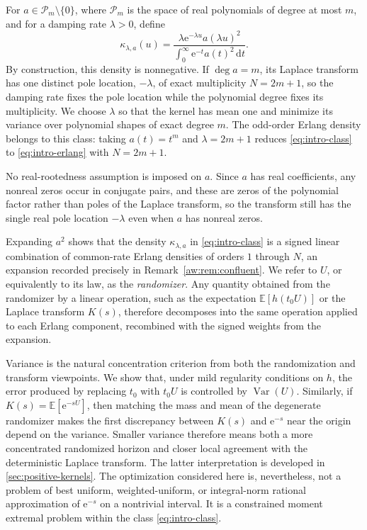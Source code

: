 \documentclass[11pt]{article}
\numberwithin{equation}{section}
\theoremstyle{definition}
\theoremstyle{remark}
\newcommand{\E}{\mathbb E}
\newcommand{\Var}{\operatorname{Var}}
\newcommand{\Pcal}{\mathcal P}
\newcommand{\dd}{\,\mathrm d}
\newcommand{\e}{\mathrm e}
\begin{document}
For $a\in\Pcal_m\setminus\{0\}$, where $\Pcal_m$ is the space of real
polynomials of degree at most $m$, and for a damping rate $\lambda>0$, define
\begin{equation}\label{eq:intro-class}
\kappa_{\lambda,a}(u)
\mathrel{{=}}
\frac{\lambda\e^{-\lambda u}a(\lambda u)^2}
{\displaystyle\int_0^\infty \e^{-t}a(t)^2\dd t}.
\end{equation}
By construction, this density is nonnegative. If $\deg a=m$, its Laplace
transform has one distinct pole location, $-\lambda$, of exact multiplicity $N=2m+1$,
so the damping rate fixes the pole location while the polynomial
degree fixes its multiplicity. We choose $\lambda$ so that the kernel
has mean one and minimize its variance over polynomial shapes of exact degree
$m$. The odd-order Erlang density belongs to this class: taking
$a(t)=t^m$ and $\lambda=2m+1$ reduces \eqref{eq:intro-class} to
\eqref{eq:intro-erlang} with $N=2m+1$.

No real-rootedness assumption is imposed on $a$. Since $a$ has real
coefficients, any nonreal zeros occur in conjugate pairs, and these are
zeros of the polynomial factor rather than poles of the Laplace transform,
so the transform still has the single real pole location $-\lambda$ even
when $a$ has nonreal zeros.

Expanding $a^2$ shows that the density $\kappa_{\lambda,a}$ in
\eqref{eq:intro-class} is a signed linear combination of common-rate Erlang
densities of orders $1$ through $N$, an expansion recorded precisely in
Remark~\ref{aw:rem:confluent}. We refer to $U$, or equivalently to its law, as the \emph{randomizer}. Any quantity obtained from the randomizer by a linear
operation, such as the expectation $\E[h(t_0U)]$ or the Laplace transform
$K(s)$, therefore decomposes into the same operation applied to each Erlang
component, recombined with the signed weights from the expansion.

Variance is the natural concentration criterion from both the randomization
and transform viewpoints. We show that, under mild regularity conditions on $h$, the
error produced by replacing $t_0$ with $t_0U$ is controlled by
$\Var(U)$. 
Similarly, if
$K(s)=\E[\e^{-sU}]$, then matching the mass and mean of the degenerate randomizer
makes the first discrepancy between $K(s)$ and $\e^{-s}$ near the
origin depend on the variance. Smaller variance therefore means both a more
concentrated randomized horizon and closer local agreement with the
deterministic Laplace transform. The latter interpretation is developed in
\cref{sec:positive-kernels}. The optimization considered here is,
nevertheless, not a problem of best uniform, weighted-uniform, or
integral-norm rational approximation of $\e^{-s}$ on a nontrivial interval.
It is a constrained moment extremal problem within the class
\eqref{eq:intro-class}.
\end{document}
